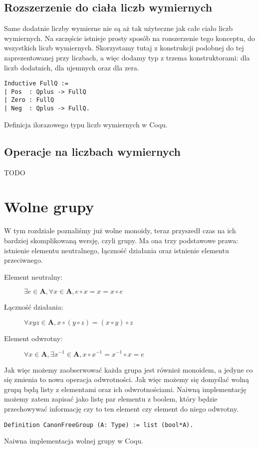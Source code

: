 \subsection{Rozszerzenie do ciała liczb wymiernych}
Same dodatnie liczby wymierne nie są aż tak użyteczne jak całe ciało liczb wymiernych. Na szczęście istnieje prosty sposób na rozszerzenie tego konceptu, do wszystkich liczb wymiernych. Skorzystamy tutaj z konstrukcji podobnej do tej zaprezentowanej przy liczbach, a więc dodamy typ z trzema konstruktorami: dla liczb dodatnich, dla ujemnych oraz dla zera.
\begin{code}
\begin{verbatim}
Inductive FullQ :=
| Pos  : Qplus -> FullQ
| Zero : FullQ
| Neg  : Qplus -> FullQ.
\end{verbatim}
\caption{Definicja ilorazowego typu liczb wymiernych w Coqu.}
\label{FullQ}
\end{code}
\subsection{Operacje na liczbach wymiernych}
TODO


\section{Wolne grupy}
W tym rozdziale poznaliśmy już wolne monoidy, teraz przyszedł czas na ich bardziej skomplikowaną wersję, czyli grupy. Ma ona trzy podstawowe prawa: istnienie elementu neutralnego, łączność działania oraz istnienie elementu przeciwnego.
\begin{description}
\item[Element neutralny:] $\exists e \in \mathbf{A}, \forall x \in \mathbf{A}, e \circ x = x = x \circ e$
\item[Łączność działania:] $\forall x y z \in \mathbf{A}, x \circ (y \circ z) = (x \circ y) \circ z$
\item[Element odwrotny:] $\forall x \in \mathbf{A}, \exists x^{-1} \in \mathbf{A}, x \circ x^{-1} = x^{-1} \circ x = e$
\end{description}
Jak więc możemy zaobserwować każda grupa jest również monoidem, a jedyne co się zmienia to nowa operacja odwrotności. Jak więc możemy się domyślać wolną grupą będą listy z elementami oraz ich odwrotnościami. Naiwną implementację możemy zatem zapisać jako listę par elementu z boolem, który będzie przechowywać informację czy to ten element czy element do niego odwrotny.  
\begin{code}
\begin{verbatim}
Definition CanonFreeGroup (A: Type) := list (bool*A).
\end{verbatim}
\caption{Naiwna implementacja wolnej grupy w Coqu.}
\label{CanonFreeGroup}
\end{code}
